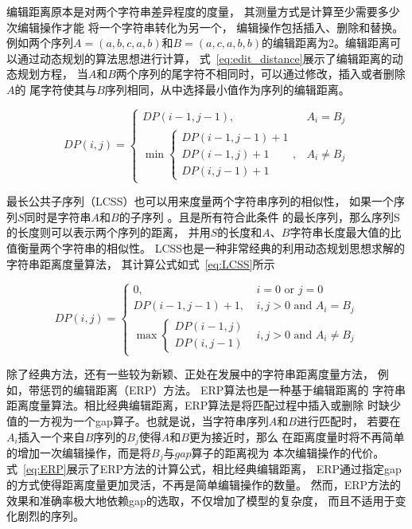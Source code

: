 编辑距离原本是对两个字符串差异程度的度量，
其测量方式是计算至少需要多少次编辑操作才能
将一个字符串转化为另一个，
编辑操作包括插入、删除和替换\cite{DBLP:journals/prl/Gorecki14}。
例如两个序列$A=\left(a,b,c,a,b\right)$和$B=\left(a,c,a,b,b\right)$的编辑距离为2。编辑距离可以通过动态规划的算法思想进行计算，
式~\ref{eq:edit_distance}展示了编辑距离的动态规划方程，
当$A$和$B$两个序列的尾字符不相同时，可以通过修改，插入或者删除$A$的
尾字符使其与$B$序列相同，从中选择最小值作为序列的编辑距离。


\begin{equation}
  DP(i, j)= \begin{cases}DP(i-1, j-1), & A_{i}=B_{j} \\
    \min \left\{\begin{array}{c}
    D P(i-1, j-1)+1 \\
    D P(i-1, j)+1 \\
    D P(i, j-1)+1
    \end{array}\right. , & A_{i} \neq B_{j}
  \end{cases}
  \label{eq:edit_distance}
\end{equation}

最长公共子序列（LCSS）也可以用来度量两个字符串序列的相似性，
如果一个序列$S$同时是字符串$A$和$B$的子序列
\cite{DBLP:conf/spire/BergrothHR00}。且是所有符合此条件
的最长序列，那么序列S的长度则可以表示两个序列的距离，
并用$S$的长度和$A$、$B$字符串长度最大值的比值衡量两个字符串的相似性。
LCSS也是一种非常经典的利用动态规划思想求解的字符串距离度量算法，
其计算公式如式~\ref{eq:LCSS}所示

\begin{equation}
  D P(i, j)= \begin{cases}0, & i=0 \text { or } j=0 \\ D P(i-1, j-1)+1, & i, j>0 \text { and } A_{i}=B_{j} \\ \max \begin{cases}D P(i-1, j) \\ D P(i, j-1)\end{cases} & i, j>0 \text { and } A_{i} \neq B_{j}\end{cases}
  \label{eq:LCSS}
\end{equation}

除了经典方法，还有一些较为新颖、正处在发展中的字符串距离度量方法，
例如，带惩罚的编辑距离（ERP）方法\cite{DBLP:conf/vldb/ChenN04}。
ERP算法也是一种基于编辑距离的
字符串距离度量算法。相比经典编辑距离，ERP算法是将匹配过程中插入或删除
时缺少值的一方视为一个gap算子。也就是说，当字符串序列$A$和$B$进行匹配时，
若要在$A_i$插入一个来自$B$序列的$B_j$使得$A$和$B$更为接近时，那么
在距离度量时将不再简单的增加一次编辑操作，而是将$B_j$与$gap$算子的距离视为
本次编辑操作的代价。式~\ref{eq:ERP}展示了ERP方法的计算公式，相比经典编辑距离，
ERP通过指定gap的方式使得距离度量更加灵活，不再是简单编辑操作的数量。
然而，ERP方法的效果和准确率极大地依赖gap的选取，不仅增加了模型的复杂度，
而且不适用于变化剧烈的序列。

